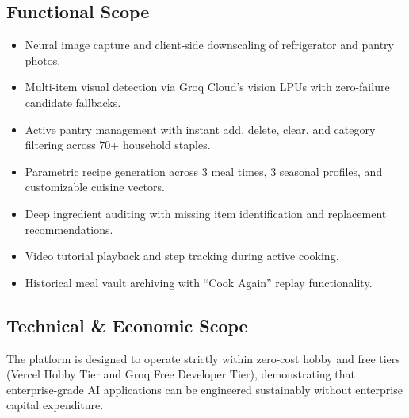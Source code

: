 \subsection*{Functional Scope}
\begin{itemize}
    \item Neural image capture and client-side downscaling of refrigerator and pantry photos.
    \item Multi-item visual detection via Groq Cloud's vision LPUs with zero-failure candidate fallbacks.
    \item Active pantry management with instant add, delete, clear, and category filtering across 70+ household staples.
    \item Parametric recipe generation across 3 meal times, 3 seasonal profiles, and customizable cuisine vectors.
    \item Deep ingredient auditing with missing item identification and replacement recommendations.
    \item Video tutorial playback and step tracking during active cooking.
    \item Historical meal vault archiving with “Cook Again” replay functionality.
\end{itemize}

\subsection*{Technical \& Economic Scope}
The platform is designed to operate strictly within zero-cost hobby and free tiers (Vercel Hobby Tier and Groq Free Developer Tier), demonstrating that enterprise-grade AI applications can be engineered sustainably without enterprise capital expenditure.

